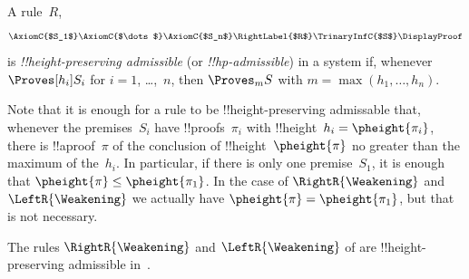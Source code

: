 \documentclass[../../../include/open-logic-section]{subfiles}
\begin{document}
\begin{defn}
A rule~$R$,
\[
\AxiomC{$S_1$}
\AxiomC{$\dots$}
\AxiomC{$S_n$}
\RightLabel{$R$}
\TrinaryInfC{$S$}
\DisplayProof
\]
is \emph{!!{height}-preserving admissible} (or
\emph{!!{hp}-admissible}) in a system if, whenever $\Proves[h_i] S_i$
for $i = 1$, \dots,~$n$, then $\Proves_m S$ with $m = \max(h_1, \dots,
h_n)$.
\end{defn}

Note that it is enough for a rule to be !!{height}-preserving
admissable that, whenever the premises~$S_i$ have !!{proof}s~$\pi_i$
with !!{height}~$h_i = \pheight{\pi_i}$, there is !!a{proof}~$\pi$ of
the conclusion of !!{height}~$\pheight{\pi}$ no greater than the
maximum of the~$h_i$. In particular, if there is only one
premise~$S_1$, it is enough that $\pheight{\pi} \le \pheight{\pi_1}$.
In the case of $\RightR{\Weakening}$ and $\LeftR{\Weakening}$ we
actually have $\pheight{\pi} = \pheight{\pi_1}$, but that is not
necessary.

\begin{prop}
The rules $\RightR{\Weakening}$ and $\LeftR{\Weakening}$ of  are
!!{height}-preserving admissible in~.
\end{prop}
\end{document}
